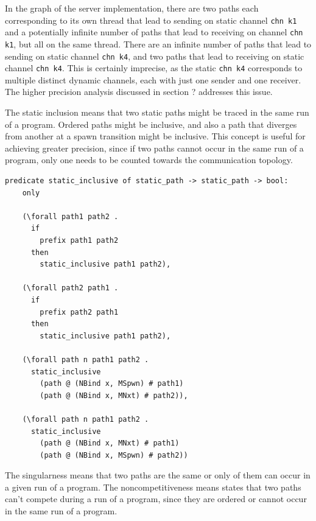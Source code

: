 \documentclass[10pt]{article}
\begin{document}
In the graph of the server implementation, there are two paths each corresponding to its
own thread that lead
to sending on
static channel \lstinline[language=sugar_lang]{chn k1} and a potentially infinite number of
paths that lead to receiving on
channel \lstinline[language=sugar_lang]{chn k1}, but all on the same thread.
There are an infinite number of paths that lead
to sending on static channel \lstinline[language=sugar_lang]{chn k4}, and two paths
that lead to receiving on static channel
\lstinline[language=sugar_lang]{chn k4}. This is certainly imprecise,
as the static \lstinline[language=sugar_lang]{chn k4} corresponds to
multiple distinct dynamic channels, each with just one sender and one receiver.  The higher
precision analysis discussed in section ? addresses this issue.


The static inclusion means that two static paths might be traced in
the same run of a program. Ordered paths might be inclusive, and also a path that diverges
from another at a spawn transition might be inclusive. This concept is useful for achieving
greater precision, since if two paths cannot occur in the same run of a program, only one needs
to be counted towards the communication topology. 

\begin{lstlisting}[language=logic, mathescape]
  predicate static_inclusive of static_path -> static_path -> bool:
    only

    (\forall path1 path2 .
      if
        prefix path1 path2
      then
        static_inclusive path1 path2),

    (\forall path2 path1 .
      if
        prefix path2 path1
      then
        static_inclusive path1 path2),

    (\forall path n path1 path2 .
      static_inclusive
        (path @ (NBind x, MSpwn) # path1)
        (path @ (NBind x, MNxt) # path2)),

    (\forall path n path1 path2 .
      static_inclusive
        (path @ (NBind x, MNxt) # path1)
        (path @ (NBind x, MSpwn) # path2))
  \end{lstlisting}


The singularness means that two paths are the same or only of them can occur in a given run of
a program. The noncompetitiveness means states that two paths can't compete during a run of a
program, since they are ordered or cannot occur in the same run of a program.
\end{document}
